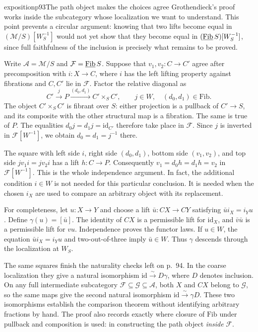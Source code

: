 \begin{dcomment}{exposition}{p93}{The path object makes the choices agree}
Grothendieck's proof works inside the subcategory whose localization we want to understand. This point prevents a circular argument: knowing that two lifts become equal in $(\mathcal M/S)[W_S^{-1}]$ would not yet show that they become equal in $(\underline{\mathrm{Fib}}\, S)[W_S^{-1}]$, since full faithfulness of the inclusion is precisely what remains to be proved.

Write $\mathcal A=\mathcal M/S$ and $\mathcal F=\underline{\mathrm{Fib}}\, S$. Suppose that $v_1,v_2:C\to C'$ agree after precomposition with $i:X\to C$, where $i$ has the left lifting property against fibrations and $C,C'$ lie in $\mathcal F$. Factor the relative diagonal as
\[
 C'\xrightarrow{j}P\xrightarrow{(d_0,d_1)}C'\times_S C',
 \qquad j\in W,\quad (d_0,d_1)\in\mathrm{Fib}.
\]
The object $C'\times_S C'$ is fibrant over $S$: either projection is a pullback of $C'\to S$, and its composite with the other structural map is a fibration. The same is true of $P$. The equalities $d_0j=d_1j=\mathrm{id}_{C'}$ therefore take place in $\mathcal F$. Since $j$ is inverted in $\mathcal F[W^{-1}]$, we obtain $d_0=d_1=j^{-1}$ there.

The square with left side $i$, right side $(d_0,d_1)$, bottom side $(v_1,v_2)$, and top side $jv_1i=jv_2i$ has a lift $h:C\to P$. Consequently $v_1=d_0h=d_1h=v_2$ in $\mathcal F[W^{-1}]$. This is the whole independence argument. In fact, the additional condition $i\in W$ is not needed for this particular conclusion. It is needed when the chosen $i_X$ are used to compare an arbitrary object with its replacement.

For completeness, let $u:X\to Y$ and choose a lift $\bar u:CX\to CY$ satisfying $\bar u i_X=i_Yu$. Define $\gamma(u)=[\bar u]$. The identity of $CX$ is a permissible lift for $\mathrm{id}_X$, and $\bar v\bar u$ is a permissible lift for $vu$. Independence proves the functor laws. If $u\in W$, the equation $\bar u i_X=i_Yu$ and two-out-of-three imply $\bar u\in W$. Thus $\gamma$ descends through the localization at $W_S$.

The same squares finish the naturality checks left on p.~94. In the coarse localization they give a natural isomorphism $\mathrm{id}\xrightarrow{\sim}D\gamma$, where $D$ denotes inclusion. On any full intermediate subcategory $\mathcal F\subseteq\mathcal G\subseteq\mathcal A$, both $X$ and $CX$ belong to $\mathcal G$, so the same maps give the second natural isomorphism $\mathrm{id}\xrightarrow{\sim}\gamma D$. These two isomorphisms establish the comparison theorem without identifying arbitrary fractions by hand. The proof also records exactly where closure of $\mathrm{Fib}$ under pullback and composition is used: in constructing the path object \emph{inside} $\mathcal F$.
\end{dcomment}


